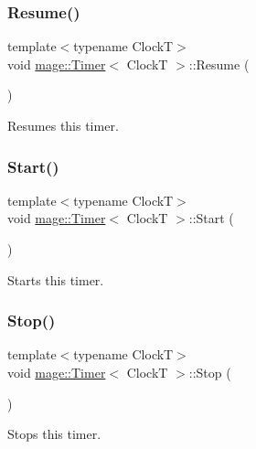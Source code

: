 \subsubsection{\texorpdfstring{Resume()}{Resume()}}
{\footnotesize\ttfamily template$<$typename ClockT$>$ \\
void \hyperlink{classmage_1_1_timer}{mage\+::\+Timer}$<$ ClockT $>$\+::Resume (\begin{DoxyParamCaption}{ }\end{DoxyParamCaption})\hspace{0.3cm}{\ttfamily [noexcept]}}

Resumes this timer. \hypertarget{classmage_1_1_timer_a633908e9e816e9397cd93b65bc11ddb3}{}\label{classmage_1_1_timer_a633908e9e816e9397cd93b65bc11ddb3} 
\subsubsection{\texorpdfstring{Start()}{Start()}}
{\footnotesize\ttfamily template$<$typename ClockT$>$ \\
void \hyperlink{classmage_1_1_timer}{mage\+::\+Timer}$<$ ClockT $>$\+::Start (\begin{DoxyParamCaption}{ }\end{DoxyParamCaption})\hspace{0.3cm}{\ttfamily [noexcept]}}

Starts this timer. \hypertarget{classmage_1_1_timer_ab9442d64c2c1bedec830004f292725ab}{}\label{classmage_1_1_timer_ab9442d64c2c1bedec830004f292725ab} 
\subsubsection{\texorpdfstring{Stop()}{Stop()}}
{\footnotesize\ttfamily template$<$typename ClockT$>$ \\
void \hyperlink{classmage_1_1_timer}{mage\+::\+Timer}$<$ ClockT $>$\+::Stop (\begin{DoxyParamCaption}{ }\end{DoxyParamCaption})\hspace{0.3cm}{\ttfamily [noexcept]}}

Stops this timer. \hypertarget{classmage_1_1_timer_a05cbba0b368e49cdf4bfebfd840e4118}{}\label{classmage_1_1_timer_a05cbba0b368e49cdf4bfebfd840e4118} 

